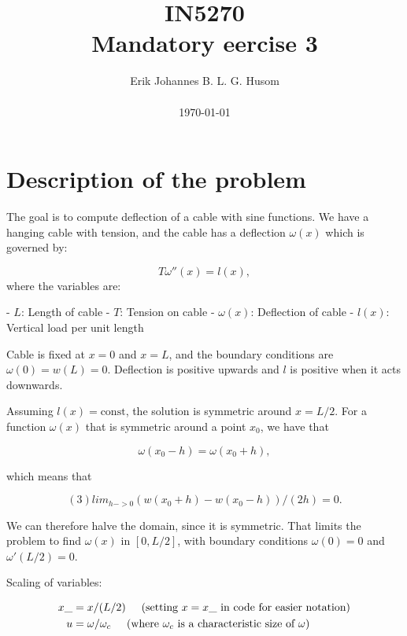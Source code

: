\documentclass[10pt, a4paper]{amsart}
\title[Mandatory exercise 3]{IN5270 \\ \large
Mandatory eercise 3}
\author[Husom]{Erik Johannes B. L. G. Husom \\ \\ \today}
\numberwithin{figure}{section}
\numberwithin{table}{section}
\begin{document}
\maketitle


\tableofcontents


\section{Description of the problem}


The goal is to compute deflection of a cable with sine functions. We have a hanging cable
with tension, and the cable has a deflection $\omega(x)$ which is governed by:

\begin{equation}
    T\omega''(x) = l(x),
\end{equation}
where the variables are:

- $L$: Length of cable
- $T$: Tension on cable
- $\omega(x)$: Deflection of cable
- $l(x)$: Vertical load per unit length

Cable is fixed at $x = 0$ and $x = L$, and the boundary conditions are $\omega(0) = w(L) = 0$. Deflection 
is positive upwards and $l$ is positive when it acts downwards.

Assuming $l(x) = \text{const}$, the solution is symmetric around $x = L/2$. For a
function $\omega(x)$ that is symmetric around a point $x_0$, we have that

\begin{equation}
\omega(x_0 - h) = \omega(x_0 + h),
\end{equation}

which means that

\begin{equation}
(3) lim_{h->0} (w(x_0+h) - w(x_0 - h))/(2h) = 0.
\end{equation}

We can therefore halve the domain, since it is symmetric. That limits the
problem to find $\omega(x)$ in $[0, L/2]$, with boundary conditions $\omega(0) = 0$
and $\omega'(L/2) = 0$.

Scaling of variables:

\begin{align}
    x\_ &= x/(L/2)  \hspace{0.5cm}    \text{(setting $x = x\_$ in code for easier notation)}\\
    u &= \omega/\omega_c \hspace{0.5cm} \text{(where $\omega_c$ is a characteristic size of $\omega$)}
\end{align}
\end{document}
